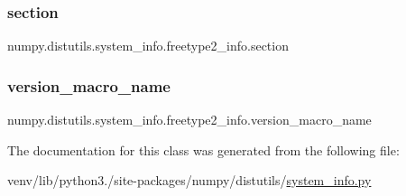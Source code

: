 \subsubsection{\texorpdfstring{section}{section}}
{\footnotesize\ttfamily numpy.\+distutils.\+system\+\_\+info.\+freetype2\+\_\+info.\+section\hspace{0.3cm}{\ttfamily [static]}}

\mbox{\label{classnumpy_1_1distutils_1_1system__info_1_1freetype2__info_a5d5b3d6e3ead365072e8ec492c391fe0}} 
\subsubsection{\texorpdfstring{version\+\_\+macro\+\_\+name}{version\_macro\_name}}
{\footnotesize\ttfamily numpy.\+distutils.\+system\+\_\+info.\+freetype2\+\_\+info.\+version\+\_\+macro\+\_\+name\hspace{0.3cm}{\ttfamily [static]}}



The documentation for this class was generated from the following file\+:\begin{DoxyCompactItemize}
\item 
venv/lib/python3./site-\/packages/numpy/distutils/\hyperlink{system__info_8py}{system\+\_\+info.\+py}\end{DoxyCompactItemize}
